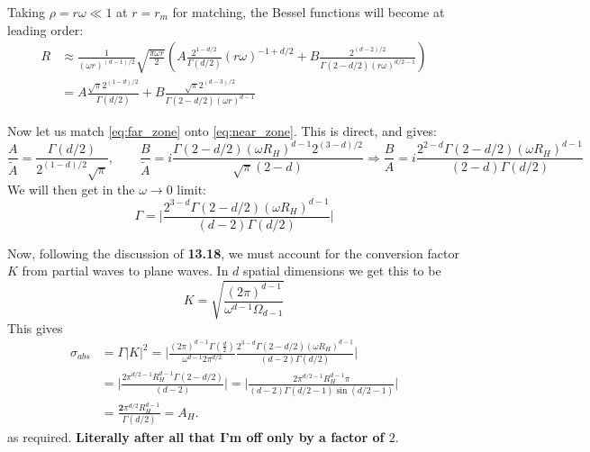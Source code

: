 \documentclass[11pt, class=article, crop=false]{standalone}
\begin{document}
\begin{enumerate}
	Taking $\rho = r \omega \ll 1$ at $r = r_m$ for matching, the Bessel functions will become at leading order:
	\begin{equation}
		\begin{aligned}\label{eq:far_zone}
				R &\approx \frac{1}{(\omega r)^{(d-1)/2}}\sqrt{\frac{\pi \omega r}{2}} \left(A \frac{2^{1-d/2}}{\Gamma(d/2)} (r\omega)^{-1+d/2} + B \frac{2^{(d-2)/2}}{\Gamma(2-d/2) (r \omega)^{d/2-1}} \right)\\
				&=  A \frac{\sqrt{\pi} 2^{(1-d)/2}}{\Gamma(d/2)}  + B \frac{\sqrt\pi 2^{(d-3)/2}}{\Gamma(2-d/2) (\omega r)^{d-1}} 
		\end{aligned}
	\end{equation}

	Now let us match \eqref{eq:far_zone} onto \eqref{eq:near_zone}. This is direct, and gives:
	\[
		\frac{A}{\tilde A} = \frac{\Gamma(d/2)}{2^{(1-d)/2} \sqrt\pi}, \qquad  \frac{B}{\tilde A} = i \frac{\Gamma(2-d/2) (\omega R_H)^{d-1} 2^{(3-d)/2}}{\sqrt\pi (2-d) } \Rightarrow \frac{B}{A} = i \frac{2^{2-d} \Gamma(2-d/2) (\omega R_H)^{d-1} }{(2-d) \Gamma(d/2)}
	\]
	We will then get in the $\omega \to 0$ limit:
	\[
		\Gamma = \Big|\frac{2^{3-d} \Gamma(2-d/2) (\omega R_H)^{d-1}}{(d-2) \Gamma(d/2)} \Big|
	\]
	
	Now, following the discussion of \textbf{13.18}, we must account for  the conversion factor $K$ from partial waves to plane waves. In $d$ spatial dimensions we get this to be
	\[
		K = \sqrt{\frac{(2\pi)^{d-1}}{\omega^{d-1} \Omega_{d-1}}} 
	\]
	This gives
	\[
	\begin{aligned}
		\sigma_{abs} &= \Gamma |K|^2 = \Big|\frac{(2\pi)^{d-1} \Gamma(\frac d2)}{\omega^{d-1} 2 \pi^{d/2}} \frac{2^{3-d} \Gamma(2-d/2) (\omega R_H)^{d-1}}{(d-2) \Gamma(d/2)} \Big|\\
		 &= \Big|\frac{2 \pi^{d/2-1} R_H^{d-1} \Gamma(2-d/2)}{(d-2)} \Big| = \Big|\frac{2 \pi^{d/2-1} R_H^{d-1} \pi}{(d-2) \Gamma(d/2 - 1) \sin(d/2-1)} \Big|\\
		 &= \frac{\mathbf{2} \pi^{d/2} R_H^{d-1}}{\Gamma(d/2)} = A_H.
	\end{aligned}
	\]
	as required. \textbf{Literally after all that I'm off only by a factor of $2$}.
	


\end{enumerate}
\end{document}
